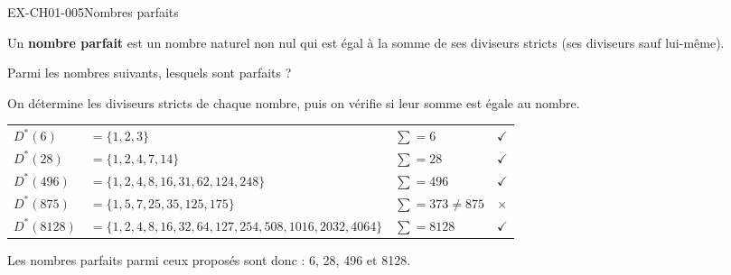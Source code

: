 
\begin{exercice}{EX-CH01-005}{Nombres parfaits}

\begin{mdframed}[backgroundcolor=vlmgray, innerleftmargin=10pt, innerrightmargin=10pt, innertopmargin=6pt, innerbottommargin=6pt, skipabove=-5pt, skipbelow=5pt]
Un \textbf{nombre parfait} est un nombre naturel non nul qui est égal à la somme de ses diviseurs stricts (ses diviseurs sauf lui-même).
\end{mdframed}


\bigskip
Parmi les nombres suivants, lesquels sont parfaits ?

\bigskip
{}%
{
On détermine les diviseurs stricts de chaque nombre, puis on vérifie si leur somme est égale au nombre.

\vspace{20pt}
\def\arraystretch{1.2}
\begin{tabularx}{\linewidth}{lXlc}
$D^*(6)$    & $= \{1, 2, 3\}$ & $\sum = 6$    & $\checkmark$ \\
$D^*(28)$   & $= \{1, 2, 4, 7, 14\}$                                             & $\sum = 28$  & $\checkmark$ \\
$D^*(496)$  & $= \{1, 2, 4, 8, 16, 31, 62, 124, 248\}$                           & $\sum = 496$  & $\checkmark$ \\
$D^*(875)$  & $= \{1, 5, 7, 25, 35, 125, 175\}$                                  & $\sum = 373 \neq 875$ & $\times$ \\
$D^*(8128)$ & $= \{1, 2, 4, 8, 16, 32, 64, 127, 254, 508, 1016, 2032, 4064\}$   & $\sum = 8128$ & $\checkmark$ \\
\end{tabularx}
\def\arraystretch{1}

\vspace{20pt}
Les nombres parfaits parmi ceux proposés sont donc : 6, 28, 496 et 8128.
}
\end{exercice}